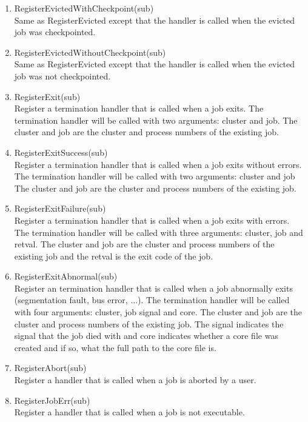 \begin{enumerate}
	\item RegisterEvictedWithCheckpoint(sub) \\
	Same as RegisterEvicted except that the handler is called when the 
	evicted job was checkpointed.

	\item RegisterEvictedWithoutCheckpoint(sub) \\
	Same as RegisterEvicted except that the handler is called when the
	evicted job was not checkpointed.

	\item RegisterExit(sub) \\
	Register a termination handler that is called when a job exits.
	The termination handler will be called with two arguments: cluster and
	job. The cluster and job are the cluster and process numbers of the
	existing job. 
	
	\item RegisterExitSuccess(sub) \\
	Register a termination handler that is called when a job exits without
	errors. The termination handler will be called with two arguments: 
	cluster and job  The cluster and job are the cluster and process
	numbers of the existing job. 

	\item RegisterExitFailure(sub) \\
	Register a termination handler that is called when a job exits with 
	errors. The termination handler will be called with three arguments:
	cluster, job and retval. The cluster and job are the cluster 
	and process numbers of the existing job and the retval is the exit
	code of the job.

	\item RegisterExitAbnormal(sub) \\
	Register an termination handler that is called when a job abnormally
	exits (segmentation fault, bus error, ...). The termination handler
	will be called with four arguments: cluster, job  signal and
	core. The cluster and job are the cluster and process numbers of 
	the existing job. The signal indicates the signal that the job
	died with and core indicates whether a core file was created and if 
	so, what the full path to the core file is.

	\item RegisterAbort(sub) \\
	Register a handler that is called when a job is aborted by a user.

	\item RegisterJobErr(sub) \\
	Register a handler that is called when a job is not executable.


\end{enumerate}
